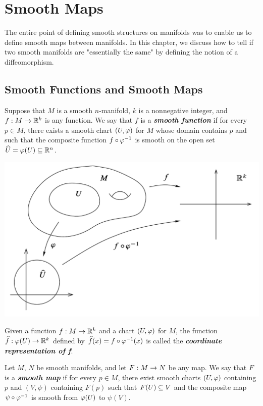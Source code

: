 \newpage\setcounter{section}{1}
\section{Smooth Maps}

The entire point of defining smooth structures on manifolds was to enable us to define smooth maps between manifolds. In this chapter, we discuss how to tell if two smooth manifolds are "essentially the same" by defining the notion of a diffeomorphism.

\subsection{Smooth Functions and Smooth Maps}\nl

\dfn Suppose that $M$ is a smooth $n$-manifold, $k$ is a nonnegative integer, and $f:M\rightarrow \mathbb{R}^k$ is any function. We say that $f$ is a \textbf{\textit{smooth function}} if for every $p\in M$, there exists a smooth chart $(U,\varphi)$ for $M$ whose domain contains $p$ and such that the composite function $f\circ\varphi^{-1}$ is smooth on the open set $\widehat U = \varphi(U) \subseteq \mathbb{R}^n$.

\begin{center}
    \includegraphics[scale = 0.35]{chapter02/c2f1.png}
\end{center}

\dfn Given a function $f:M\rightarrow \mathbb{R}^k$ and a chart $(U,\varphi)$ for $M$, the function $\widehat f:\varphi(U)\rightarrow \mathbb{R}^k$ defined by $\widehat f(x) = f\circ\varphi^{-1}(x)$ is called the \textbf{\textit{coordinate representation of f}}.

\dfn Let $M,\,N$ be smooth manifolds, and let $F:M\rightarrow N$ be any map. We say that $F$ is a \textbf{\textit{smooth map}} if for every $p\in M$, there exist smooth charts $(U,\varphi)$ containing $p$ and $(V,\psi)$ containing $F(p)$ such that $F(U)\subseteq V$ and the composite map $\psi\circ\varphi^{-1}$ is smooth from $\varphi(U)$ to $\psi(V)$.

